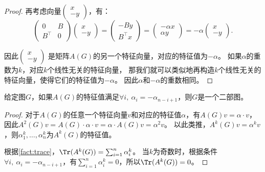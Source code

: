 \documentclass[lang=cn,newtx,10pt,scheme=chinese,chinesefont=nofont,citestyle=gb7714-2015, bibstyle=gb7714-2015]{elegantbook}
\begin{document}
\begin{refsection}
\begin{proof}
    再考虑向量$\left(\begin{array}{cc}
    x \\
    -y
    \end{array}\right)$，有：
    \[
    \left(\begin{array}{cc}
    0 & B \\
    B^\top & 0
    \end{array}\right)
    \left(\begin{array}{cc}
    x \\
    -y
    \end{array}\right)
    =\left(\begin{array}{cc}
    -By \\
    B^\top x
    \end{array}\right)
    =\left(\begin{array}{cc}
    -\alpha x \\
    \alpha y
    \end{array}\right)
    =-\alpha\left(\begin{array}{cc}
    x \\
    -y
    \end{array}\right).
    \]

    因此$\left(\begin{array}{cc}
    x \\
    -y
    \end{array}\right)$
    是矩阵$A(G)$的另一个特征向量，对应的特征值为$-\alpha$。
    如果$\alpha$的重数为$k$，对应$k$个线性无关的特征向量，
    那我们就可以类似地再构造$k$个线性无关的特征向量，使得它们的特征值为$-\alpha$。
    因此$\alpha$和$-\alpha$的重数相同。
\end{proof}

\begin{lemma}\label{lem:bipartite-2}
    给定图$G$，如果$A(G)$的特征值满足$\forall i,\ \alpha_i=-\alpha_{n-i+1}$，则$G$是一个二部图。
\end{lemma}

\begin{proof}
    对于$A(G)$的任意一个特征向量$v$和对应的特征值$\alpha$，有$A(G)v=\alpha\cdot v$，因此$A^2(G)v=A(G)\cdot\alpha\cdot v=\alpha\cdot A(G)v=\alpha^2 v$。
    以此类推，$A^k(G)v=\alpha^kv$，则$\alpha_1^k,\dots,\alpha_n^k$为$A^k(G)$的特征值。
    
    根据\cref{fact:trace}，$\Tr(A^k(G))=\sum_{i=1}^n\alpha_i^k$。
    当$k$为奇数时，根据条件$\forall i,\ \alpha_i=-\alpha_{n-i+1}$，有$\sum_{i=1}^n\alpha_i^k=0$，所以$\Tr(A^k(G))=0$。
    

\end{proof}
\end{refsection}
\end{document}
